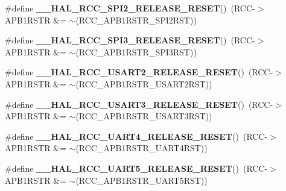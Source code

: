 \begin{DoxyCompactItemize}
\#define {\bfseries \+\_\+\+\_\+\+H\+A\+L\+\_\+\+R\+C\+C\+\_\+\+S\+P\+I2\+\_\+\+R\+E\+L\+E\+A\+S\+E\+\_\+\+R\+E\+S\+ET}()~(R\+CC-\/$>$A\+P\+B1\+R\+S\+TR \&= $\sim$(R\+C\+C\+\_\+\+A\+P\+B1\+R\+S\+T\+R\+\_\+\+S\+P\+I2\+R\+ST))
\item 
\mbox{\label{group___r_c_c_ex___force___release___peripheral___reset_ga1fb7a5367cfed25545058af0eb4f55f1}} 
\#define {\bfseries \+\_\+\+\_\+\+H\+A\+L\+\_\+\+R\+C\+C\+\_\+\+S\+P\+I3\+\_\+\+R\+E\+L\+E\+A\+S\+E\+\_\+\+R\+E\+S\+ET}()~(R\+CC-\/$>$A\+P\+B1\+R\+S\+TR \&= $\sim$(R\+C\+C\+\_\+\+A\+P\+B1\+R\+S\+T\+R\+\_\+\+S\+P\+I3\+R\+ST))
\item 
\mbox{\label{group___r_c_c_ex___force___release___peripheral___reset_ga8baebf28a2739de5f3c5ef72519b9499}} 
\#define {\bfseries \+\_\+\+\_\+\+H\+A\+L\+\_\+\+R\+C\+C\+\_\+\+U\+S\+A\+R\+T2\+\_\+\+R\+E\+L\+E\+A\+S\+E\+\_\+\+R\+E\+S\+ET}()~(R\+CC-\/$>$A\+P\+B1\+R\+S\+TR \&= $\sim$(R\+C\+C\+\_\+\+A\+P\+B1\+R\+S\+T\+R\+\_\+\+U\+S\+A\+R\+T2\+R\+ST))
\item 
\mbox{\label{group___r_c_c_ex___force___release___peripheral___reset_ga25b71d0f7fb3b9455fb360fcb780c492}} 
\#define {\bfseries \+\_\+\+\_\+\+H\+A\+L\+\_\+\+R\+C\+C\+\_\+\+U\+S\+A\+R\+T3\+\_\+\+R\+E\+L\+E\+A\+S\+E\+\_\+\+R\+E\+S\+ET}()~(R\+CC-\/$>$A\+P\+B1\+R\+S\+TR \&= $\sim$(R\+C\+C\+\_\+\+A\+P\+B1\+R\+S\+T\+R\+\_\+\+U\+S\+A\+R\+T3\+R\+ST))
\item 
\mbox{\label{group___r_c_c_ex___force___release___peripheral___reset_gabbfb393dffbb0652bbd581302f4de609}} 
\#define {\bfseries \+\_\+\+\_\+\+H\+A\+L\+\_\+\+R\+C\+C\+\_\+\+U\+A\+R\+T4\+\_\+\+R\+E\+L\+E\+A\+S\+E\+\_\+\+R\+E\+S\+ET}()~(R\+CC-\/$>$A\+P\+B1\+R\+S\+TR \&= $\sim$(R\+C\+C\+\_\+\+A\+P\+B1\+R\+S\+T\+R\+\_\+\+U\+A\+R\+T4\+R\+ST))
\item 
\mbox{\label{group___r_c_c_ex___force___release___peripheral___reset_ga7009cc550412874444d1d519b0b56b07}} 
\#define {\bfseries \+\_\+\+\_\+\+H\+A\+L\+\_\+\+R\+C\+C\+\_\+\+U\+A\+R\+T5\+\_\+\+R\+E\+L\+E\+A\+S\+E\+\_\+\+R\+E\+S\+ET}()~(R\+CC-\/$>$A\+P\+B1\+R\+S\+TR \&= $\sim$(R\+C\+C\+\_\+\+A\+P\+B1\+R\+S\+T\+R\+\_\+\+U\+A\+R\+T5\+R\+ST))

\end{DoxyCompactItemize}
